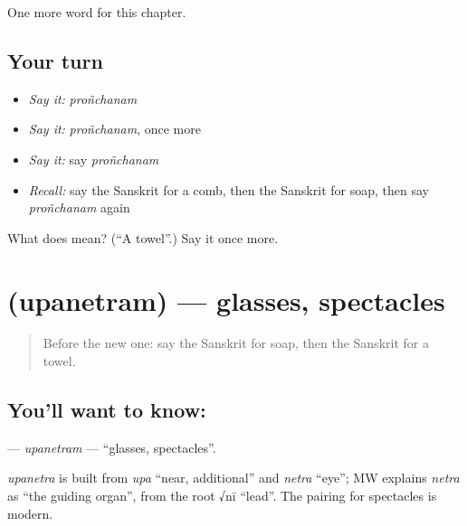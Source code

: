 \begin{grammarlens}[title={What you've built}]
One more word for this chapter.
\end{grammarlens}

\subsection*{Your turn}
\begin{itemize}
\raggedright
  \item \emph{Say it:} \emph{proñchanam}
  \item \emph{Say it:} \emph{proñchanam}, once more
  \item \emph{Say it:} say \emph{proñchanam}
  \item \emph{Recall:} say the Sanskrit for a comb, then the Sanskrit for soap, then say \emph{proñchanam} again
\end{itemize}

\begin{tcolorbox}[breakable,colback=teal!4,colframe=teal!35!black,title={Before you move on}]
What does  mean? (\textquotedblleft{}A towel\textquotedblright{}.) Say it once more.
\end{tcolorbox}
\section[\texorpdfstring{\sk{उपनेत्रम्} (upanetram)}{उपनेत्रम् (upanetram)}]{ (upanetram) — glasses, spectacles}

\label{lesson:SA-C101-upanetram}



\begin{quote}
Before the new one: say the Sanskrit for soap, then the Sanskrit for a towel.
\end{quote}

\subsection*{You'll want to know: }
\textbf{} — \emph{upanetram} — \textquotedblleft{}glasses, spectacles\textquotedblright{}.

\begin{cousinweb}
\emph{upanetra} is built from \emph{upa} \textquotedblleft{}near, additional\textquotedblright{} and \emph{netra} \textquotedblleft{}eye\textquotedblright{}; MW explains \emph{netra} as \textquotedblleft{}the guiding organ\textquotedblright{}, from the root √nī \textquotedblleft{}lead\textquotedblright{}. The pairing for spectacles is modern.
\end{cousinweb}

